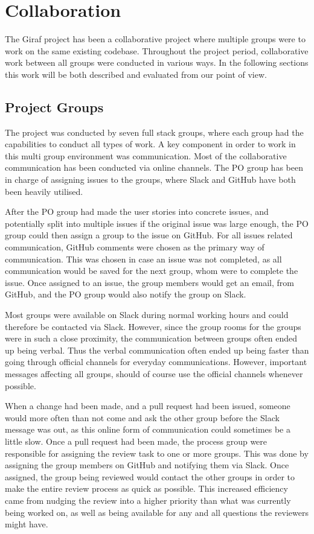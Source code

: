 \chapter{Collaboration}
The Giraf project has been a collaborative project where multiple groups were to work on the same existing codebase.
Throughout the project period, collaborative work between all groups were conducted in various ways.  
In the following sections this work will be both described and evaluated from our point of view.

\section{Project Groups}
The project was conducted by seven full stack groups, where each group had the capabilities to conduct all types of work.
A key component in order to work in this multi group environment was communication.
Most of the collaborative communication has been conducted via online channels.
The PO group has been in charge of assigning issues to the groups, where Slack and GitHub have both been heavily utilised.

After the PO group had made the user stories into concrete issues, and potentially split into multiple issues if the original issue was large enough, the PO group could then assign a group to the issue on GitHub.
For all issues related communication, GitHub comments were chosen as the primary way of communication. 
This was chosen in case an issue was not completed, as all communication would be saved for the next group, whom were to complete the issue.
Once assigned to an issue, the group members would get an email, from GitHub, and the PO group would also notify the group on Slack. 

Most groups were available on Slack during normal working hours and could therefore be contacted via Slack.
However, since the group rooms for the groups were in such a close proximity, the communication between groups often ended up being verbal.
Thus the verbal communication often ended up being faster than going through official channels for everyday communications.
However, important messages affecting all groups, should of course use the official channels whenever possible.

When a change had been made, and a pull request had been issued, someone would more often than not come and ask the other group before the Slack message was out, as this online form of communication could sometimes be a little slow.
Once a pull request had been made, the process group were responsible for assigning the review task to one or more groups. 
This was done by assigning the group members on GitHub and notifying them via Slack. 
Once assigned, the group being reviewed would contact the other groups in order to make the entire review process as quick as possible.
This increased efficiency came from nudging the review into a higher priority than what was currently being worked on, as well as being available for any and all questions the reviewers might have.

